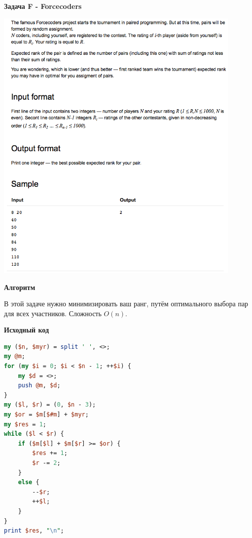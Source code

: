\documentclass[a4paper,12pt]{article}
\begin{document}
\newpage
\textbf{{\large Задача F - Forcecoders}}

\begin{center}
\includegraphics[width=0.9\textwidth]{Vekua_2016_Anton/F.png}\\ [1cm]
\end{center}

\textbf{{\large Алгоритм}}

В этой задаче нужно минимизировать ваш ранг, путём оптимального выбора пар для всех участников. Сложность $O(n)$. \\

\newpage

\textbf{{\large Исходный код}} \\
\begin{lstlisting}[language=Perl]
my ($n, $myr) = split ' ', <>;
my @m;
for (my $i = 0; $i < $n - 1; ++$i) {
	my $d = <>;
	push @m, $d;
}
my ($l, $r) = (0, $n - 3);
my $or = $m[$#m] + $myr;
my $res = 1;
while ($l < $r) {
	if ($m[$l] + $m[$r] >= $or) {
		$res += 1;
		$r -= 2;
	}
	else {
		--$r;
		++$l;
	}
}
print $res, "\n";
\end{lstlisting}
 
\end{document}
